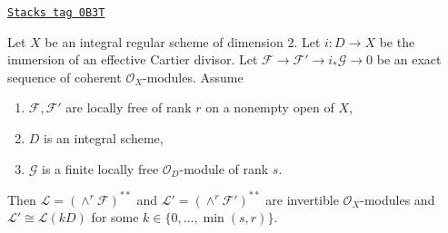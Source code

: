 \begin{lemma}
\label{divisors-lemma-wedge-product-ses}
\href{https://stacks.math.columbia.edu/tag/0B3T}{\texttt{Stacks tag 0B3T}}

Let $X$ be an integral regular scheme of dimension $2$.
Let $i : D \to X$ be the immersion of an effective Cartier divisor.
Let $\mathcal{F} \to \mathcal{F}' \to i_*\mathcal{G} \to 0$
be an exact sequence of coherent $\mathcal{O}_X$-modules.
Assume
\begin{enumerate}
\item $\mathcal{F}, \mathcal{F}'$ are locally free of rank $r$ on a nonempty
open of $X$,
\item $D$ is an integral scheme,
\item $\mathcal{G}$ is a finite locally free $\mathcal{O}_D$-module
of rank $s$.
\end{enumerate}
Then $\mathcal{L} = (\wedge^r\mathcal{F})^{**}$ and
$\mathcal{L}' = (\wedge^r \mathcal{F}')^{**}$
are invertible $\mathcal{O}_X$-modules and
$\mathcal{L}' \cong \mathcal{L}(k D)$ for some
$k \in \{0, \ldots, \min(s, r)\}$.
\end{lemma}

